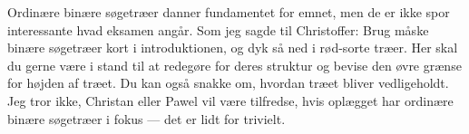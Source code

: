 \begin{textit}
  Ordinære binære søgetræer danner fundamentet for emnet, men de er ikke spor
interessante hvad eksamen angår. Som jeg sagde til Christoffer: Brug måske binære
søgetræer kort i introduktionen, og dyk så ned i rød-sorte træer. Her skal du gerne
være i stand til at redegøre for deres struktur og bevise den øvre grænse for højden
af træet. Du kan også snakke om, hvordan træet bliver vedligeholdt.
\newline\newline
Jeg tror ikke, Christan eller Pawel vil være tilfredse, hvis oplægget har ordinære
binære søgetræer i fokus — det er lidt for trivielt.
\end{textit}
